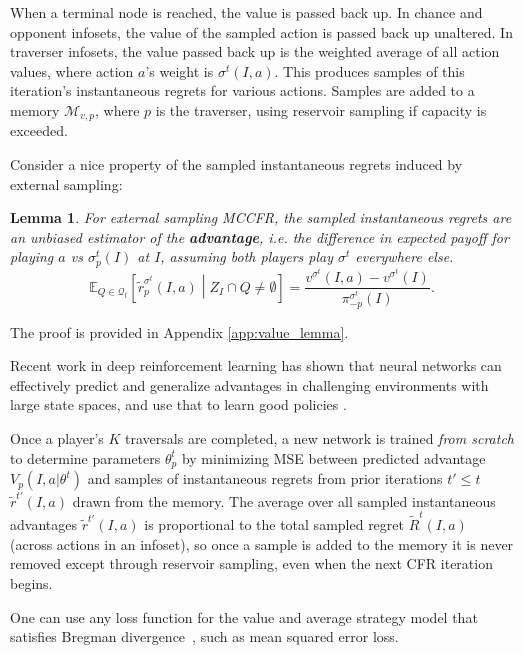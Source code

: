 \documentclass{article}
\newtheorem{lemma}{Lemma}
\begin{document}
When a terminal node is reached, the value is passed back up. In chance and opponent infosets, the value of the sampled action is passed back up unaltered. In traverser infosets, the value passed back up is the weighted average of all action values, where action $a$'s weight is $\sigma^t(I,a)$. This produces samples of this iteration's instantaneous regrets for various actions. Samples are added to a memory $\mathcal{M}_{v,p}$, where $p$ is the traverser, using reservoir sampling \citep{vitter1985random} if capacity is exceeded.

Consider a nice property of the sampled instantaneous regrets induced by external sampling:
\begin{lemma}
\label{lemma:value_lemma}
For external sampling MCCFR, the sampled instantaneous regrets are an unbiased estimator of the \textbf{advantage}, i.e. the difference in expected payoff for playing $a$ vs $\sigma_p^t(I)$ at $I$, assuming both players play $\sigma^t$ everywhere else. $$\mathbb{E}_{Q\in \mathcal{Q}_t} \left[ \tilde{r}_p^{\sigma^t}(I,a) \middle| Z_I \cap Q \neq \emptyset \right] = \frac{v^{\sigma^t}(I,a) - v^{\sigma^t}(I)}{\pi_{-p}^{\sigma^t}(I)}.$$
\end{lemma}

The proof is provided in Appendix \ref{app:value_lemma}. 

Recent work in deep reinforcement learning has shown that neural networks can effectively predict and generalize advantages in challenging environments with large state spaces, and use that to learn good policies \cite{mnih2016asynchronous}.

Once a player's $K$ traversals are completed, a new network is trained \emph{from scratch} to determine parameters $\theta_p^t$ by minimizing MSE between predicted advantage $V_p(I,a|\theta^t)$ and samples of instantaneous regrets from prior iterations $t' \le t$ $\tilde{r}^{t'}(I,a)$ drawn from the memory.
The average over all sampled instantaneous advantages $\tilde{r}^{t'}(I,a)$ is proportional to the total sampled regret $\tilde{R}^t(I,a)$ (across actions in an infoset), so once a sample is added to the memory it is never removed except through reservoir sampling, even when the next CFR iteration begins. 

One can use any loss function for the value and average strategy model that satisfies Bregman divergence~\cite{banerjee2005clustering}, such as mean squared error loss.
\end{document}
